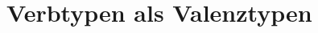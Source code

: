 \documentclass[handout,aspectratio=1610,dvipsnames]{beamer}
\begin{document}
  \section[Verbtypen]{Verbtypen als Valenztypen}
  \let\woopsi\section\let\section\subsection\let\subsection\subsubsection
  
  \let\subsection\section\let\section\woopsi
  
\end{document}
